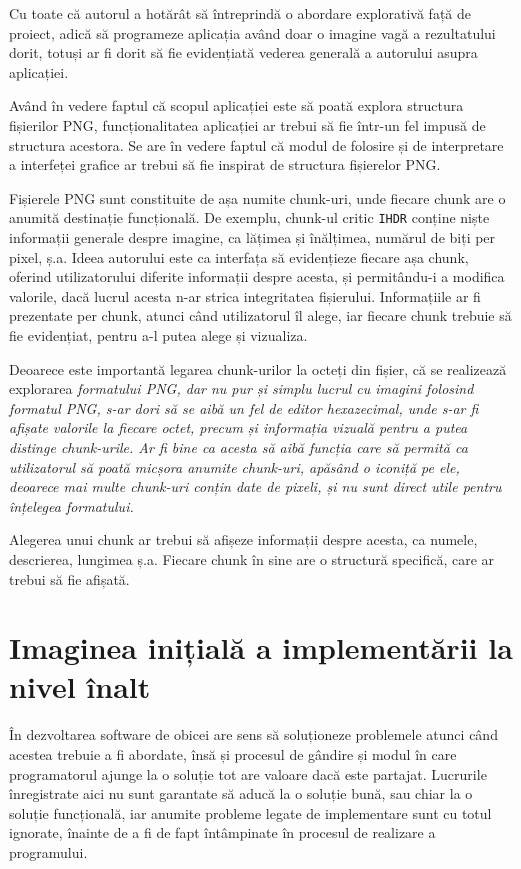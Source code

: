 \documentclass[a4paper,12pt]{report}
\begin{document}
Cu toate că autorul a hotărât să întreprindă o abordare explorativă față de proiect,
adică să programeze aplicația având doar o imagine vagă a rezultatului dorit,
totuși ar fi dorit să fie evidențiată vederea generală a autorului asupra aplicației.

Având în vedere faptul că scopul aplicației este să poată explora structura fișierilor PNG,
funcționalitatea aplicației ar trebui să fie într-un fel impusă de structura acestora.
Se are în vedere faptul că modul de folosire și de interpretare a interfeței grafice 
ar trebui să fie inspirat de structura fișierelor PNG.

Fișierele PNG sunt constituite de așa numite chunk-uri,
unde fiecare chunk are o anumită destinație funcțională.
De exemplu, chunk-ul critic \texttt{IHDR} conține niște informații generale despre imagine,
ca lățimea și înălțimea, numărul de biți per pixel, ș.a.
Ideea autorului este ca interfața să evidențieze fiecare așa chunk,
oferind utilizatorului diferite informații despre acesta,
și permitându-i a modifica valorile, dacă lucrul acesta n-ar strica integritatea fișierului.
Informațiile ar fi prezentate per chunk, atunci când utilizatorul îl alege,
iar fiecare chunk trebuie să fie evidențiat, pentru a-l putea alege și vizualiza.

Deoarece este importantă legarea chunk-urilor la octeți din fișier, că se realizează explorarea
\it{formatului} PNG, dar nu pur și simplu lucrul cu imagini folosind formatul PNG, s-ar dori să se aibă
un fel de editor hexazecimal, unde s-ar fi afișate valorile la fiecare octet,
precum și informația vizuală pentru a putea distinge chunk-urile.
Ar fi bine ca acesta să aibă funcția care să permită ca utilizatorul să poată micșora anumite chunk-uri,
apăsând o iconiță pe ele, deoarece mai multe chunk-uri conțin date de pixeli,
și nu sunt direct utile pentru înțelegea formatului.

Alegerea unui chunk ar trebui să afișeze informații despre acesta,
ca numele, descrierea, lungimea ș.a.
Fiecare chunk în sine are o structură specifică, care ar trebui să fie afișată.


\section{Imaginea inițială a implementării la nivel înalt}

În dezvoltarea software de obicei are sens să soluționeze
problemele atunci când acestea trebuie a fi abordate,
însă și procesul de gândire și modul în care programatorul ajunge la o soluție
tot are valoare dacă este partajat.
Lucrurile înregistrate aici nu sunt garantate să aducă la o soluție bună,
sau chiar la o soluție funcțională, iar anumite probleme legate de implementare
sunt cu totul ignorate, înainte de a fi de fapt întâmpinate în procesul de realizare a programului.
\end{document}
